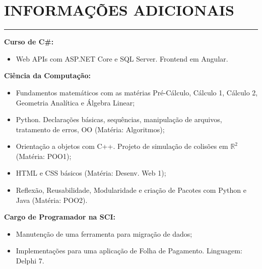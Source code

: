 \documentclass[11pt]{article}
\begin{document}
\vspace{1.0em}\section*{INFORMAÇÕES ADICIONAIS}
\hrule
\begin{flushleft}
\begin{multicols}{2}
    \vspace{0.1em} 
    
    \textbf{Curso de C\#:} \\
    \begin{itemize}[leftmargin=*]
        \item Web APIs com ASP.NET Core e SQL Server. Frontend em Angular.
    \end{itemize}

    \textbf{Ciência da Computação:} \\
    \begin{itemize}[leftmargin=*]
        \item Fundamentos matemáticos com as matérias Pré-Cálculo, Cálculo 1, Cálculo 2, Geometria Analítica e Álgebra Linear;
        \item Python. Declarações básicas, sequências, manipulação de arquivos, tratamento de erros, OO (Matéria: Algoritmos);
        \item Orientação a objetos com C++. Projeto de simulação de colisões em $\mathbb{R}^2$ (Matéria: POO1);
        \item HTML e CSS básicos (Matéria: Desenv. Web 1);
        \item Reflexão, Reusabilidade, Modularidade e criação de Pacotes com Python e Java (Matéria: POO2).
    \end{itemize}

    \textbf{Cargo de Programador na SCI:} \\
    \begin{itemize}[leftmargin=*]
        \item Manutenção de uma ferramenta para migração de dados;
        \item Implementações para uma aplicação de Folha de Pagamento. Linguagem: Delphi 7.
    \end{itemize}
    
\end{multicols}
\end{flushleft}
\end{document}
